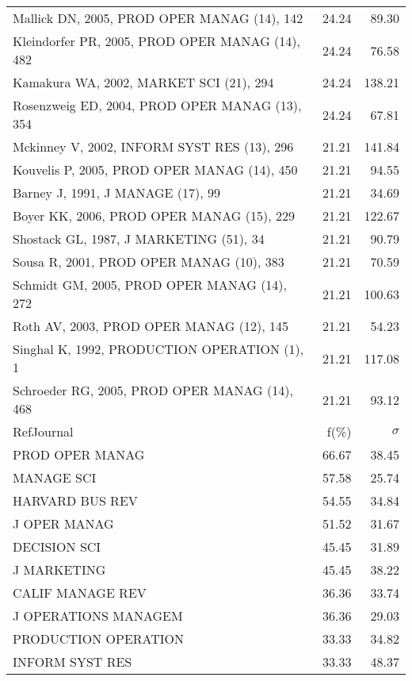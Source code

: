 \documentclass[a4paper,11pt]{report}
\begin{document}
\begin{landscape}
\begin{table}[!ht]
{\begin{tabular}{|l r r|}
Mallick DN, 2005, PROD OPER MANAG (14), 142 & 24.24 & 89.30\\
Kleindorfer PR, 2005, PROD OPER MANAG (14), 482 & 24.24 & 76.58\\
Kamakura WA, 2002, MARKET SCI (21), 294 & 24.24 & 138.21\\
Rosenzweig ED, 2004, PROD OPER MANAG (13), 354 & 24.24 & 67.81\\
Mckinney V, 2002, INFORM SYST RES (13), 296 & 21.21 & 141.84\\
Kouvelis P, 2005, PROD OPER MANAG (14), 450 & 21.21 & 94.55\\
Barney J, 1991, J MANAGE (17), 99 & 21.21 & 34.69\\
Boyer KK, 2006, PROD OPER MANAG (15), 229 & 21.21 & 122.67\\
Shostack GL, 1987, J MARKETING (51), 34 & 21.21 & 90.79\\
Sousa R, 2001, PROD OPER MANAG (10), 383 & 21.21 & 70.59\\
Schmidt GM, 2005, PROD OPER MANAG (14), 272 & 21.21 & 100.63\\
Roth AV, 2003, PROD OPER MANAG (12), 145 & 21.21 & 54.23\\
Singhal K, 1992, PRODUCTION OPERATION (1), 1 & 21.21 & 117.08\\
Schroeder RG, 2005, PROD OPER MANAG (14), 468 & 21.21 & 93.12\\
\hline
\hline
RefJournal & f(\%) & $\sigma$\\
\hline
PROD OPER MANAG & 66.67 & 38.45\\
MANAGE SCI & 57.58 & 25.74\\
HARVARD BUS REV & 54.55 & 34.84\\
J OPER MANAG & 51.52 & 31.67\\
DECISION SCI & 45.45 & 31.89\\
J MARKETING & 45.45 & 38.22\\
CALIF MANAGE REV & 36.36 & 33.74\\
J OPERATIONS MANAGEM & 36.36 & 29.03\\
PRODUCTION OPERATION & 33.33 & 34.82\\
INFORM SYST RES & 33.33 & 48.37\\
\hline
\end{tabular}
}
\end{table}

\clearpage


\end{landscape}
\end{document}
